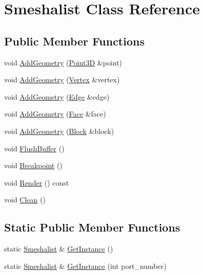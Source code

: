 \hypertarget{class_smeshalist}{}\section{Smeshalist Class Reference}
\label{class_smeshalist}
\subsection*{Public Member Functions}
\begin{DoxyCompactItemize}
\item 
void \hyperlink{class_smeshalist_a41602e1155a57128f4e261a471f0ae4a}{Add\+Geometry} (\hyperlink{class_point3_d}{Point3D} \&point)
\item 
void \hyperlink{class_smeshalist_adc9851608ab3ef54319f6549250275e7}{Add\+Geometry} (\hyperlink{class_vertex}{Vertex} \&vertex)
\item 
void \hyperlink{class_smeshalist_ae07be2d0483ccc8f21eabadd0ff4d2fb}{Add\+Geometry} (\hyperlink{class_edge}{Edge} \&edge)
\item 
void \hyperlink{class_smeshalist_a3b562ba90203c809e48c42f635b50e70}{Add\+Geometry} (\hyperlink{class_face}{Face} \&face)
\item 
void \hyperlink{class_smeshalist_a4307536971e1f8bfcd921b4f12198579}{Add\+Geometry} (\hyperlink{class_block}{Block} \&block)
\item 
void \hyperlink{class_smeshalist_a312ced405b18cf134ee15d7ea66b2632}{Flush\+Buffer} ()
\item 
void \hyperlink{class_smeshalist_a096f7b67b9bb28c4b70274812d45db36}{Breakpoint} ()
\item 
void \hyperlink{class_smeshalist_aeb4349559d8417e17fb659827dec57c7}{Render} () const
\item 
void \hyperlink{class_smeshalist_a0bdba425a903528f2ecef7297da7486e}{Clean} ()
\end{DoxyCompactItemize}
\subsection*{Static Public Member Functions}
\begin{DoxyCompactItemize}
\item 
static \hyperlink{class_smeshalist}{Smeshalist} \& \hyperlink{class_smeshalist_ae8da75b21c37c5559aa39318e039694a}{Get\+Instance} ()
\item 
static \hyperlink{class_smeshalist}{Smeshalist} \& \hyperlink{class_smeshalist_a44524c05ed6ebe5ad1a632378d5d4037}{Get\+Instance} (int port\+\_\+number)
\end{DoxyCompactItemize}


